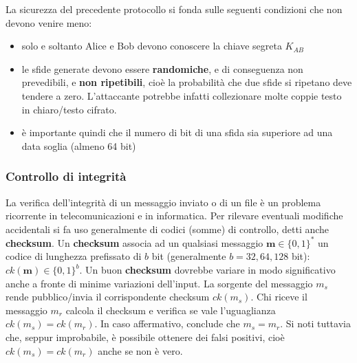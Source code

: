 La sicurezza del precedente protocollo si fonda sulle seguenti condizioni che non devono venire meno:
\begin{itemize}
  \item solo e soltanto Alice e Bob devono conoscere la chiave segreta $K_{AB}$
  \item le sfide generate devono essere \textbf{randomiche}, e di conseguenza non prevedibili, e \textbf{non ripetibili}, cioè la probabilità che due sfide si ripetano deve tendere a zero. L'attaccante potrebbe infatti collezionare molte coppie testo in chiaro/testo cifrato.
  \item è importante quindi che il numero di bit di una sfida sia superiore ad una data soglia (almeno 64 bit)
\end{itemize}

\subsubsection{Controllo di integrità}
La verifica dell'integrità di un messaggio inviato o di un file è un problema ricorrente in telecomunicazioni e in informatica. Per rilevare eventuali modifiche accidentali si fa uso generalmente di codici (somme) di controllo, detti anche \textbf{checksum}. Un \textbf{checksum} associa ad un qualsiasi messaggio $\textbf{m} \in \{0,1\}^*$ un codice di lunghezza prefissato di $b$ bit (generalmente $b = 32,64,128$ bit): $ck(\textbf{m}) \in \{0,1\}^b$. Un buon \textbf{checksum} dovrebbe variare in modo significativo anche a fronte di minime variazioni dell'input. \newline \newline 
La sorgente del messaggio $m_{s}$ rende pubblico/invia il corrispondente checksum $ck(m_{s})$. Chi riceve il messaggio $m_{r}$ calcola il checksum e verifica se vale l'uguaglianza $ck(m_{s}) = ck(m_{r})$. In caso affermativo, conclude che $m_{s} = m_{r}$. Si noti tuttavia che, seppur improbabile, è possibile ottenere dei falsi positivi, cioè $ck(m_{s}) = ck(m_{r} )$ anche se non è vero.

